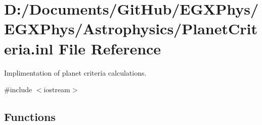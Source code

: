 \hypertarget{_planet_criteria_8inl}{}\section{D\+:/\+Documents/\+Git\+Hub/\+E\+G\+X\+Phys/\+E\+G\+X\+Phys/\+Astrophysics/\+Planet\+Criteria.inl File Reference}
\label{_planet_criteria_8inl}


Implimentation of planet criteria calculations.  


{\ttfamily \#include $<$iostream$>$}\newline
\subsection*{Functions}
